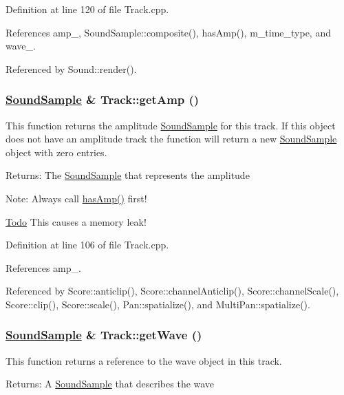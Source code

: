 Definition at line 120 of file Track.cpp.

References amp\_\-, Sound\-Sample::composite(), has\-Amp(), m\_\-time\_\-type, and wave\_\-.

Referenced by Sound::render().\hypertarget{classTrack_a7}{
\subsubsection[getAmp]{\setlength{\rightskip}{0pt plus 5cm}\hyperlink{classSoundSample}{Sound\-Sample} \& Track::get\-Amp ()}}
\label{classTrack_a7}


This function returns the amplitude \hyperlink{classSoundSample}{Sound\-Sample} for this track. If this object does not have an amplitude track the function will return a new \hyperlink{classSoundSample}{Sound\-Sample} object with zero entries. \begin{Desc}
\item[Returns:]The \hyperlink{classSoundSample}{Sound\-Sample} that represents the amplitude \end{Desc}
\begin{Desc}
\item[Note:]Always call \hyperlink{classTrack_a6}{has\-Amp()} first! \end{Desc}
\begin{Desc}
\item[\hyperlink{todo__todo000011}{Todo}]This causes a memory leak! \end{Desc}


Definition at line 106 of file Track.cpp.

References amp\_\-.

Referenced by Score::anticlip(), Score::channel\-Anticlip(), Score::channel\-Scale(), Score::clip(), Score::scale(), Pan::spatialize(), and Multi\-Pan::spatialize().\hypertarget{classTrack_a5}{
\subsubsection[getWave]{\setlength{\rightskip}{0pt plus 5cm}\hyperlink{classSoundSample}{Sound\-Sample} \& Track::get\-Wave ()}}
\label{classTrack_a5}


This function returns a reference to the wave object in this track. \begin{Desc}
\item[Returns:]A \hyperlink{classSoundSample}{Sound\-Sample} that describes the wave \end{Desc}


